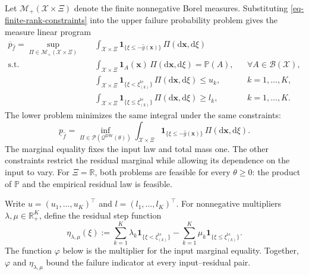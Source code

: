 \documentclass[review,11pt,3p,authoryear,nopreprintline]{elsarticle}
\begin{document}
Let $\mathcal M_+(\mathcal X\times\Xi)$ denote the finite nonnegative Borel measures. Substituting \eqref{eq-finite-rank-constraints} into the upper failure probability problem gives the measure linear program
\begin{equation}
  \begin{aligned}
    \overline p_{\hat f}
    =\sup_{\Pi\in\mathcal M_+(\mathcal X\times\Xi)}\quad&
      \int_{\mathcal X\times\Xi}
      \mathbf1_{\{\xi\le -\hat g(\bm x)\}}\,\Pi(\mathrm d\bm x,\mathrm d\xi)\\
    \text{s.t.}\quad&
      \int_{\mathcal X\times\Xi}
      \mathbf1_A(\bm x)\,\Pi(\mathrm d\bm x,\mathrm d\xi)
      =\mathbb P(A),
      &&\forall A\in\mathcal B(\mathcal X),\\
    &\int_{\mathcal X\times\Xi}
      \mathbf1_{\{\xi<\xi_{(k)}^{\mathrm{te}}\}}\,\Pi(\mathrm d\bm x,\mathrm d\xi)\le u_k,
      &&k=1,\ldots,K,\\
    &\int_{\mathcal X\times\Xi}
      \mathbf1_{\{\xi\le \xi_{(k)}^{\mathrm{te}}\}}\,\Pi(\mathrm d\bm x,\mathrm d\xi)\ge l_k,
      &&k=1,\ldots,K.
  \end{aligned}
  \label{eq-measure-upper}
\end{equation}
The lower problem minimizes the same integral under the same constraints:
\begin{equation}
  \underline p_{\hat f}
  =\inf_{\Pi\in\mathscr P(\mathscr Q^{\mathrm{DW}}(\theta))}
    \int_{\mathcal X\times\Xi}
    \mathbf1_{\{\xi\le -\hat g(\bm x)\}}\,\Pi(\mathrm d\bm x,\mathrm d\xi).
  \label{eq-measure-lower}
\end{equation}
The marginal equality fixes the input law and total mass one. The other constraints restrict the residual marginal while allowing its dependence on the input to vary. For $\Xi=\mathbb R$, both problems are feasible for every $\theta\ge0$: the product of $\mathbb P$ and the empirical residual law is feasible.

Write $u=(u_1,\ldots,u_K)^\top$ and $l=(l_1,\ldots,l_K)^\top$. For nonnegative multipliers $\lambda,\mu\in\mathbb R_+^K$, define the residual step function
\begin{equation}
  \eta_{\lambda,\mu}(\xi)
  :=\sum_{k=1}^K\lambda_k\mathbf1_{\{\xi<\xi_{(k)}^{\mathrm{te}}\}}
    -\sum_{k=1}^K\mu_k\mathbf1_{\{\xi\le \xi_{(k)}^{\mathrm{te}}\}}.
  \label{eq-dual-step-function}
\end{equation}
The function $\varphi$ below is the multiplier for the input marginal equality. Together, $\varphi$ and $\eta_{\lambda,\mu}$ bound the failure indicator at every input--residual pair.
\end{document}
